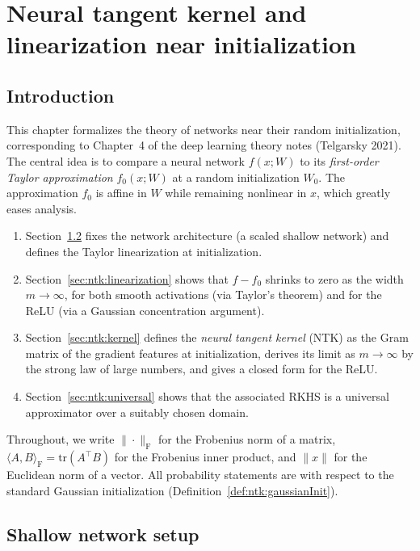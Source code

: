 \chapter{Neural tangent kernel and linearization near initialization}\label{chap:ntk}

\section{Introduction}

This chapter formalizes the theory of networks near their random initialization,
corresponding to Chapter~4 of the deep learning theory notes (Telgarsky 2021).
The central idea is to compare a neural network $f(x;W)$ to its
\emph{first-order Taylor approximation} $f_0(x;W)$ at a random initialization $W_0$.
The approximation $f_0$ is affine in $W$ while remaining nonlinear in $x$,
which greatly eases analysis.

\begin{enumerate}
  \item Section~\ref{sec:ntk:setup} fixes the network architecture (a scaled shallow network)
        and defines the Taylor linearization at initialization.
  \item Section~\ref{sec:ntk:linearization} shows that $f - f_0$ shrinks to zero as the
        width $m \to \infty$, for both smooth activations (via Taylor's theorem) and for the
        ReLU (via a Gaussian concentration argument).
  \item Section~\ref{sec:ntk:kernel} defines the \emph{neural tangent kernel} (NTK) as the
        Gram matrix of the gradient features at initialization, derives its limit as
        $m \to \infty$ by the strong law of large numbers, and gives a closed form for the ReLU.
  \item Section~\ref{sec:ntk:universal} shows that the associated RKHS is a universal
        approximator over a suitably chosen domain.
\end{enumerate}

Throughout, we write $\|\cdot\|_{\mathrm{F}}$ for the Frobenius norm of a matrix,
$\langle A, B \rangle_{\mathrm{F}} = \mathrm{tr}(A^\top B)$ for the Frobenius inner product,
and $\|x\|$ for the Euclidean norm of a vector.
All probability statements are with respect to the standard Gaussian initialization
(Definition~\ref{def:ntk:gaussianInit}).


\section{Shallow network setup}\label{sec:ntk:setup}

